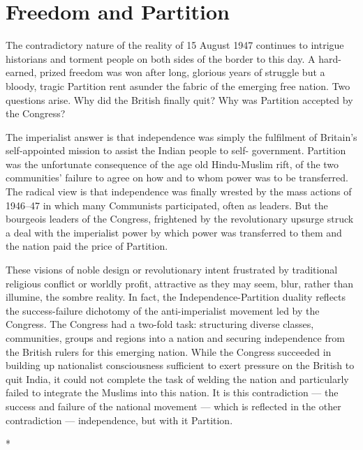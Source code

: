 \chapter{Freedom and Partition}
\begin{multicols}{2}

The contradictory nature of the reality of 15 August 1947 continues to intrigue historians and torment people on both sides of the border to this day. A hard-earned, prized freedom was won after long, glorious years of struggle but a bloody, tragic Partition rent asunder the fabric of the emerging free nation. Two questions arise. Why did the British finally quit? Why was Partition accepted by the Congress? 

The imperialist answer is that independence was simply the fulfilment of Britain's self-appointed mission to assist the Indian people to self- government. Partition was the unfortunate consequence of the age old Hindu-Muslim rift, of the two communities' failure to agree on how and to whom power was to be transferred. The radical view is that independence was finally wrested by the mass actions of 1946--47 in which many Communists participated, often as leaders. But the bourgeois leaders of the Congress, frightened by the revolutionary upsurge struck a deal with the imperialist power by which power was transferred to them and the nation paid the price of Partition. 

These visions of noble design or revolutionary intent frustrated by traditional religious conflict or worldly profit, attractive as they may seem, blur, rather than illumine, the sombre reality. In fact, the Independence-Partition duality reflects the success-failure dichotomy of the anti-imperialist movement led by the Congress. The Congress had a two-fold task: structuring diverse classes, communities, groups and regions into a nation and securing independence from the British rulers for this emerging nation. While the Congress succeeded in building up nationalist consciousness sufficient to exert pressure on the British to quit India, it could not complete the task of welding the nation and particularly failed to integrate the Muslims into this nation. It is this contradiction --- the success and failure of the national movement --- which is reflected in the other contradiction --- independence, but with it Partition.

\begin{center}*\end{center}

\paragraph*{}


\end{multicols}
